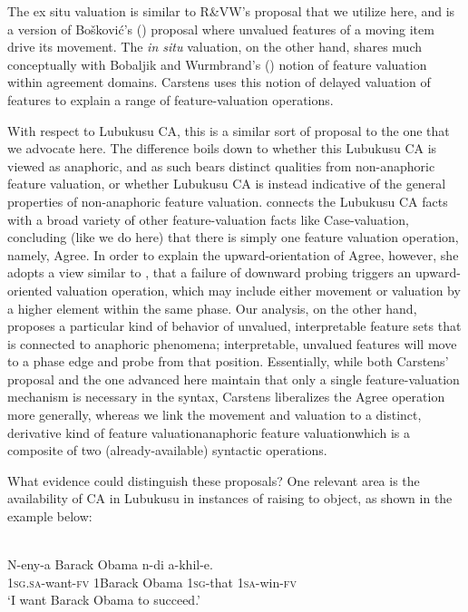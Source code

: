 \documentclass[output=paper
,modfonts
,nonflat
]{langsci/langscibook}
\begin{document}
The ex situ valuation is similar to R\&VW’s proposal that we utilize here, and is a version of Bošković’s (\citeyear{Boskovic:2007b,Boskovic:2011}) proposal where unvalued features of a moving item drive its movement. The \textit{in situ} valuation, on the other hand, shares much conceptually with Bobaljik and Wurmbrand’s (\citeyear{BobaljikWurmbrand:2005}) notion of feature valuation within agreement domains.  Carstens uses this notion of delayed valuation of features to explain a range of feature-valuation operations.  

With respect to Lubukusu CA, this is a similar sort of proposal to the one that we advocate here. The difference boils down to whether this Lubukusu CA is viewed as anaphoric, and as such bears distinct qualities from non-anaphoric feature valuation, or whether Lubukusu CA is instead indicative of the general properties of non-anaphoric feature valuation. \citet{Carstens:2016} connects the Lubukusu CA facts with a broad variety of other feature-valuation facts like Case-valuation, concluding (like we do here) that there is simply one feature valuation operation, namely, Agree.  In order to explain the upward-orientation of Agree, however, she adopts a view similar to \citet{Bejar:2009}, that a failure of downward probing triggers an upward-oriented valuation operation, which may include either movement or valuation by a higher element within the same phase. Our analysis, on the other hand, proposes a particular kind of behavior of unvalued, interpretable feature sets that is connected to anaphoric phenomena; interpretable, unvalued features will move to a phase edge and probe from that position. Essentially, while both Carstens’ proposal and the one advanced here maintain that only a single feature-valuation mechanism is necessary in the syntax, Carstens liberalizes the Agree operation more generally, whereas we link the movement and valuation to a distinct, derivative kind of feature valuation\textemdash anaphoric feature valuation\textemdash which is a composite of two (already-available) syntactic operations.

What evidence could distinguish these proposals? One relevant area is the availability of CA in Lubukusu in instances of raising to object, as shown in the example below: 

\ea	\label{RtOwithCA}
 \\
\gll N-eny-a Barack Obama n-di a-khil-e.\\
1\textsc{sg}.\textsc{sa}-want-\textsc{fv} 1Barack Obama 1\textsc{sg}-that 1\textsc{sa}-win-\textsc{fv}\\
\glt `I want Barack Obama to succeed.'
\z
\end{document}
